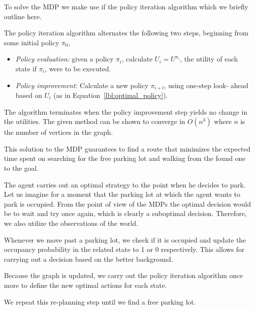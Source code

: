 To solve the MDP we make use if the policy iteration algorithm which we
briefly outline here.

The policy iteration algorithm alternates the following two steps, beginning
from some initial policy $\pi_0$,

\begin{itemize}
    \item \emph{Policy evaluation:} given a policy $\pi_i$,
    calculate $U_i = U^{\pi_i}$, the utility of each state if $\pi_i$, were to be
    executed.
    \item \emph{Policy improvement:} Calculate a new policy
    $\pi_{i+l}$, using one-step look- ahead based on $U_i$ (as in
    Equation~\ref{lbl:optimal_policy}).
\end{itemize}

The algorithm terminates when the policy improvement step yields no change in
the utilities. The given method can be shown to converge in $O(n^3)$ where $n$
is the number of vertices in the graph.

This solution to the MDP guarantees to find a route that minimizes the
expected time spent on searching for the free parking lot and walking from the
found one to the goal.


The agent carries out an optimal strategy to the point when he decides to
park. Let us imagine for a moment that the parking lot at which the agent
wants to park is occupied. From the point of view of the MDPs the optimal
decision would be to wait and try once again, which is clearly a suboptimal
decision. Therefore, we also utilize the observations of the world.

Whenever we move past a parking lot, we check if it is occupied and update
the occupancy probability in the related state to 1 or 0 respectively.
This allows for carrying out a decision based on the better background.

Because the graph is updated, we carry out the policy iteration algorithm
once more to define the new optimal actions for each state.

We repeat this re-planning step until we find a free parking lot.

